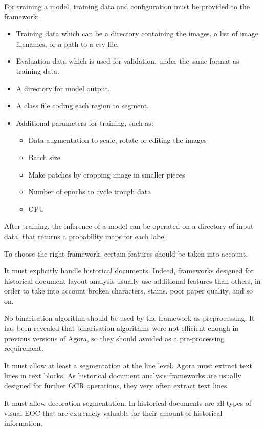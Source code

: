 \documentclass{polytech/polytech}
\numberwithin{figure}{chapter}
\begin{document}
For training a model, training data and configuration must be provided to the framework:
\begin{itemize}
\item Training data which can be a directory containing the images, a list of image filenames, or a path to a csv file.
\item Evaluation data which is used for validation, under the same format as training data.
\item A directory for model output.
\item A class file coding each region to segment.
\item Additional parameters for training, such as:
	\begin{itemize}
	\item Data augmentation to scale, rotate or editing the images
	\item Batch size
	\item Make patches by cropping image in smaller pieces
	\item Number of epochs to cycle trough data
	\item GPU
	\end{itemize}
\end{itemize}

After training, the inference of a model can be operated on a directory of input data, that returns a probability maps for each label


To choose the right framework, certain features should be taken into account.

It must explicitly handle historical documents.
Indeed, frameworks designed for historical document layout analysis usually use additional features than others, in order to take into account broken characters, stains, poor paper quality, and so on.

No binarisation algorithm should be used by the framework as preprocessing.
It has been revealed that binarisation algorithms were not efficient enough in previous versions of Agora, so they should avoided as a pre-processing requirement.

It must allow at least a segmentation at the line level.
Agora must extract text lines in text blocks.
As historical document analysis frameworks are usually designed for further OCR operations, they very often extract text lines.

It must allow decoration segmentation.
In historical documents are all types of visual EOC that are extremely valuable for their amount of historical information.
\end{document}
